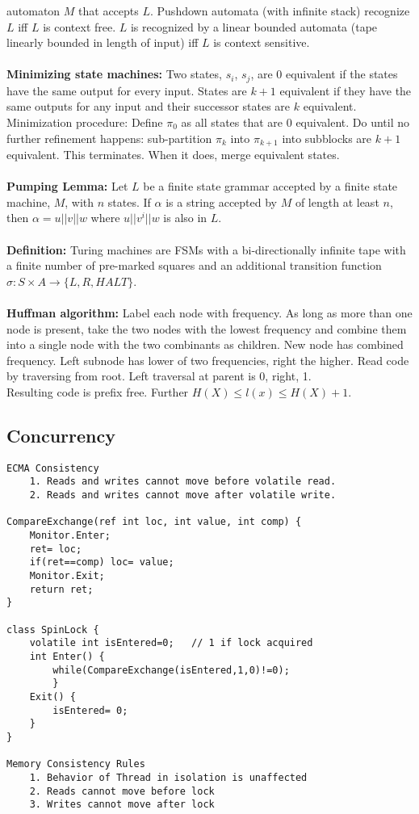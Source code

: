 automaton $M$ that accepts $L$.
Pushdown automata (with infinite stack) recognize $L$ iff $L$ is context free.
$L$ is recognized by a linear bounded automata  (tape linearly bounded in length of
input) iff $L$ is context sensitive.
\\
\\
{\bf Minimizing state machines:} Two states, $s_i$, $s_j$, are $0$ equivalent if
the states have the same output for every input.  States are $k+1$ equivalent if they
have the same outputs for any input and their successor states are $k$ equivalent.
Minimization procedure:  Define $\pi_0$ as all states that are $0$ equivalent.  Do until
no further refinement happens: sub-partition $\pi_{k}$ into $\pi_{k+1}$ into subblocks are
$k+1$ equivalent.  This terminates.  When it does, merge equivalent states.
\\
\\
{\bf Pumping Lemma:}  Let $L$ be a finite state grammar accepted by a finite state
machine, $M$, with $n$ states.
If $\alpha$ is a string accepted by $M$ of length at least $n$, then
$\alpha = u||v||w$ where $u||v^i||w$ is also in $L$.\\
\\
{\bf Definition:}
Turing machines are FSMs with a bi-directionally infinite tape with a finite
number of pre-marked squares and an additional transition function
$\sigma: S \times A \rightarrow \{L, R, HALT\}$.
\\
\\
{\bf Huffman algorithm:}  Label each node with frequency.  As long as more than one
node is present, take the two nodes with the lowest frequency and combine them
into a single node with the two combinants as children.
New node has combined frequency.  Left subnode has lower of two frequencies,
right the higher.  Read code by traversing from root.  Left traversal at parent is
0, right, 1.
\\
Resulting code is prefix free.  Further $H(X) \leq l(x) \leq H(X)+1$.
\subsection{Concurrency}
\begin{verbatim}
ECMA Consistency
    1. Reads and writes cannot move before volatile read.
    2. Reads and writes cannot move after volatile write.

CompareExchange(ref int loc, int value, int comp) {
    Monitor.Enter;
    ret= loc;
    if(ret==comp) loc= value;
    Monitor.Exit;
    return ret;
}

class SpinLock {
    volatile int isEntered=0;   // 1 if lock acquired
    int Enter() {
        while(CompareExchange(isEntered,1,0)!=0);
        }
    Exit() {
        isEntered= 0;
    }
}

Memory Consistency Rules
    1. Behavior of Thread in isolation is unaffected
    2. Reads cannot move before lock
    3. Writes cannot move after lock
\end{verbatim}

